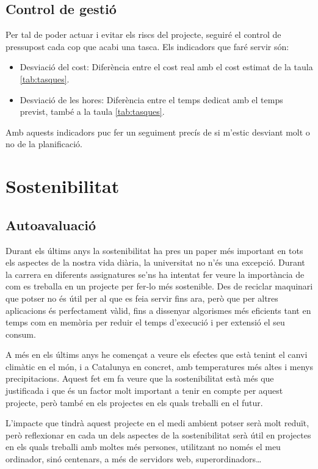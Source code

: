 \documentclass{article}
\begin{document}
\subsection{Control de gestió}

Per tal de poder actuar i evitar els riscs del projecte, seguiré el control de pressupost cada cop que acabi una tasca. Els indicadors que faré servir són:

\begin{itemize}
    \item Desviació del cost: Diferència entre el cost real amb el cost estimat de la taula \ref{tab:tasques}.
    \item Desviació de les hores: Diferència entre el temps dedicat amb el temps previst, també a la taula \ref{tab:tasques}.
\end{itemize}

Amb aquests indicadors puc fer un seguiment precís de si m'estic desviant molt o no de la planificació.

\newpage

\section{Sostenibilitat}

\subsection{Autoavaluació}

Durant els últims anys la sostenibilitat ha pres un paper més important en tots els aspectes de la nostra vida diària, la universitat no n'és una excepció. Durant la carrera en diferents assignatures se'ns ha intentat fer veure la importància de com es treballa en un projecte per fer-lo més sostenible. Des de reciclar maquinari que potser no és útil per al que es feia servir fins ara, però que per altres aplicacions és perfectament vàlid, fins a dissenyar algorismes més eficients tant en temps com en memòria per reduir el temps d'execució i per extensió el seu consum.

A més en els últims anys he començat a veure els efectes que està tenint el canvi climàtic en el món, i a Catalunya en concret, amb temperatures més altes i menys precipitacions. Aquest fet em fa veure que la sostenibilitat està més que justificada i que és un factor molt important a tenir en compte per aquest projecte, però també en els projectes en els quals treballi en el futur.

L'impacte que tindrà aquest projecte en el medi ambient potser serà molt reduït, però reflexionar en cada un dels aspectes de la sostenibilitat serà útil en projectes en els quals treballi amb moltes més persones, utilitzant no només el meu ordinador, sinó centenars, a més de servidors web, superordinadors…
\end{document}
